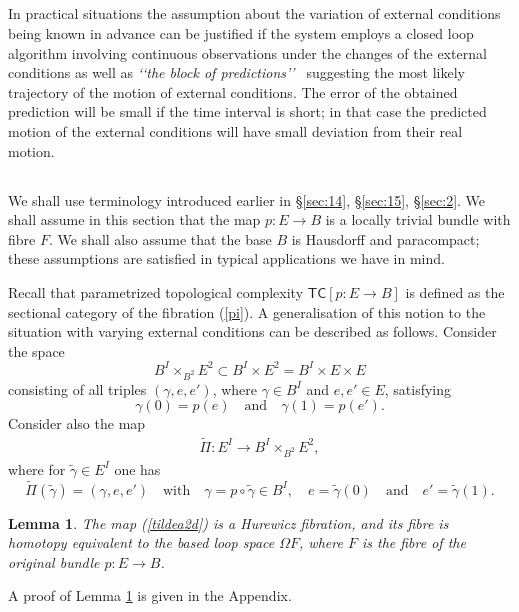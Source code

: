 \documentclass[11pt]{amsart}
\newtheorem{lemma}[theorem]{Lemma}
\def\tc{{\mathsf{TC}}}
\begin{document}
\subsection{} In practical situations the assumption about the variation of external conditions being known in advance can be justified if the system employs a closed loop algorithm involving continuous observations under the changes of the external conditions as well as {\it \lq\lq the block of predictions\rq\rq\ }
 suggesting the most likely trajectory of the motion of external conditions. The error of the obtained prediction will be small if the time interval is short; in that case the predicted motion of the external conditions will have small deviation from their real motion.  


\subsection{} \label{subsec:32} We shall use terminology introduced earlier in \S \ref{sec:14}, \S \ref{sec:15}, \S \ref{sec:2}. We shall assume in this section that the map 
$p:E\to B$ is a locally trivial bundle with fibre $F$. We shall also assume that the base $B$ is Hausdorff and paracompact; these assumptions are satisfied in typical applications we have in mind. 

Recall that parametrized topological complexity $\tc[p:E\to B]$ is defined as the sectional category of the fibration 
(\ref{pi}). 
A generalisation of this notion to the situation with varying external conditions can be described as follows. 
Consider the space 
$$B^I\times_{B^2}E^2\subset B^I\times E^2= B^I\times E\times E$$ consisting of all triples $(\gamma, e, e')$, 
where $\gamma\in B^I$ and $e, e'\in E$,
satisfying 
$$\gamma(0)=p(e)\quad\mbox{and}\quad  \gamma(1)=p(e').$$ 
Consider also the map
\begin{eqnarray}\label{tildea2d}
\tilde \Pi: E^I \to B^I\times_{B^2} E^2,
\end{eqnarray}
where for $\tilde \gamma\in E^I$ one has 
$$
\tilde \Pi(\tilde \gamma) = (\gamma, e, e')
\quad \mbox{with}\quad \gamma =p\circ \tilde \gamma\in B^I, \quad e=\tilde\gamma(0)\quad\mbox{and} \quad e'=\tilde\gamma(1).
$$
\begin{lemma}\label{lm:6}
The map (\ref{tildea2d}) is a Hurewicz fibration, and its fibre is homotopy equivalent to the based loop space $\Omega F$, where $F$ is the fibre of the original bundle $p:E\to B$. 
\end{lemma}
A proof of Lemma \ref{lm:6} is given in the Appendix. 
\end{document}
